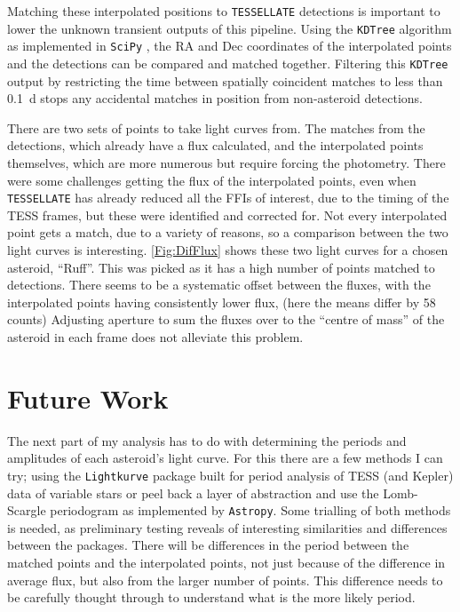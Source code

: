 \documentclass[12pt]{article}
\begin{document}
Matching these interpolated positions to \texttt{TESSELLATE} detections is important to lower the unknown transient outputs of this pipeline. 
Using the \texttt{KDTree} algorithm \citep{Maneewongvatana1999} as implemented in \texttt{SciPy} \citep{2020SciPy-NMeth}, the RA and Dec coordinates of the interpolated points and the detections can be compared and matched together. 
Filtering this \texttt{KDTree} output by restricting the time between spatially coincident matches to less than \qty{0.1}{\day} stops any accidental matches in position from non-asteroid detections. 
    
There are two sets of points to take light curves from. 
The matches from the detections, which already have a flux calculated, and the interpolated points themselves, which are more numerous but require forcing the photometry. 
There were some challenges getting the flux of the interpolated points, even when \texttt{TESSELLATE} has already reduced all the FFIs of interest, due to the timing of the TESS frames, but these were identified and corrected for.
Not every interpolated point gets a match, due to a variety of reasons, %
so a comparison between the two light curves is interesting. 
\autoref{Fig:DifFlux} shows these two light curves for a chosen asteroid, ``Ruff''. 
This was picked as it has a high number of points matched to detections.
There seems to be a systematic offset between the fluxes, with the interpolated points having consistently lower flux, (here the means differ by 58 counts)
Adjusting aperture to sum the fluxes over to the ``centre of mass'' of the asteroid in each frame does not alleviate this problem. 

\section{Future Work}

The next part of my analysis has to do with determining the periods and amplitudes of each asteroid's light curve.
For this there are a few methods I can try; using the \texttt{Lightkurve} \citep{Lightkurve2018} package built for period analysis of TESS (and Kepler) data of variable stars or peel back a layer of abstraction and use the Lomb-Scargle periodogram as implemented by \texttt{Astropy}\cite{Astropy2022}. 
Some trialling of both methods is needed, as preliminary testing reveals of interesting similarities and differences between the packages. 
There will be differences in the period between the matched points and the interpolated points, not just because of the difference in average flux, but also from the larger number of points. This difference needs to be carefully thought through to understand what is the more likely period.
\end{document}

